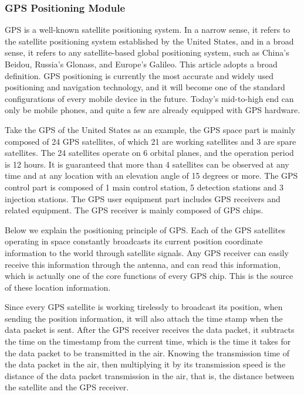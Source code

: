 \documentclass[conference]{IEEEtran}
\begin{document}
\subsubsection{GPS Positioning Module}
GPS is a well-known satellite positioning system. In a narrow sense, it refers to the satellite positioning system established by the United States, and in a broad sense, it refers to any satellite-based global positioning system, such as China's Beidou, Russia's Glonass, and Europe's Galileo. This article adopts a broad definition. GPS positioning is currently the most accurate and widely used positioning and navigation technology, and it will become one of the standard configurations of every mobile device in the future. Today's mid-to-high end can only be mobile phones, and quite a few are already equipped with GPS hardware.

Take the GPS of the United States as an example, the GPS space part is mainly composed of 24 GPS satellites, of which 21 are working satellites and 3 are spare satellites. The 24 satellites operate on 6 orbital planes, and the operation period is 12 hours. It is guaranteed that more than 4 satellites can be observed at any time and at any location with an elevation angle of 15 degrees or more. The GPS control part is composed of 1 main control station, 5 detection stations and 3 injection stations. The GPS user equipment part includes GPS receivers and related equipment. The GPS receiver is mainly composed of GPS chips.

Below we explain the positioning principle of GPS. Each of the GPS satellites operating in space constantly broadcasts its current position coordinate information to the world through satellite signals. Any GPS receiver can easily receive this information through the antenna, and can read this information, which is actually one of the core functions of every GPS chip. This is the source of these location information.

Since every GPS satellite is working tirelessly to broadcast its position, when sending the position information, it will also attach the time stamp when the data packet is sent. After the GPS receiver receives the data packet, it subtracts the time on the timestamp from the current time, which is the time it takes for the data packet to be transmitted in the air. Knowing the transmission time of the data packet in the air, then multiplying it by its transmission speed is the distance of the data packet transmission in the air, that is, the distance between the satellite and the GPS receiver.
\end{document}
